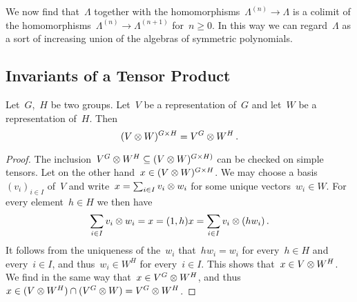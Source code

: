 \documentclass[a4paper,11pt]{scrartcl}
\begin{document}
We now find that~$\Lambda$ together with the homomorphisms~$\Lambda^{(n)} \to \Lambda$ is a colimit of the homomorphisms~$\Lambda^{(n)} \to \Lambda^{(n+1)}$ for~$n \geq 0$.
In this way we can regard~$\Lambda$ as a sort of increasing union of the algebras of symmetric polynomials.



\subsection{Invariants of a Tensor Product}

\begin{lemma}
  \label{invariants of tensor product}
  Let~$G$,~$H$ be two groups.
  Let~$V$ be a representation of~$G$ and let~$W$ be a representation of~$H$.
  Then
  \[
    (V \otimes W)^{G \times H}
    =
    V^G \otimes W^H \,.
  \]
\end{lemma}

\begin{proof}
  The inclusion~$V^G \otimes W^H \subseteq (V \otimes W)^{G \times H)}$ can be checked on simple tensors.
  Let on the other hand~$x \in (V \otimes W)^{G \times H}$.
  We may choose a basis~$(v_i)_{i \in I}$ of~$V$ and write~$x = \sum_{i \in I} v_i \otimes w_i$ for some unique vectors~$w_i \in W$.
  For every element~$h \in H$ we then have
  \[
    \sum_{i \in I} v_i \otimes w_i
    =
    x
    =
    (1,h) x
    =
    \sum_{i \in I} v_i \otimes (h w_i) \,.
  \]
  It follows from the uniqueness of the~$w_i$ that~$h w_i = w_i$ for every~$h \in H$ and every~$i \in I$, and thus~$w_i \in W^H$ for every~$i \in I$.
  This shows that~$x \in V \otimes W^H$.
  We find in the same way that~$x \in V^G \otimes W^H$, and thus~$x \in (V \otimes W^H) \cap (V^G \otimes W) = V^G \otimes W^H$.
\end{proof}





\printbibliography
\end{document}
